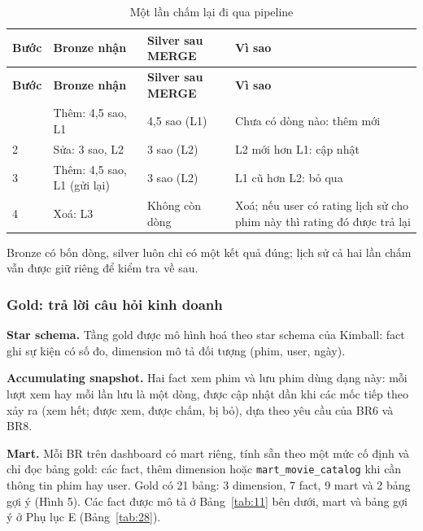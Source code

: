 \documentclass[a4paper,11pt]{article}
\newlength{\reporttablewidth}
\newcommand{\dbsep}{\_\allowbreak}
\begin{document}
\begingroup
\small
{}
\setlength{\tabcolsep}{4pt}
\renewcommand{\arraystretch}{1.18}
\setlength{\reporttablewidth}{\dimexpr\linewidth-6\tabcolsep\relax}
\begin{longtable}{@{}L{0.13\reporttablewidth} L{0.25\reporttablewidth} L{0.27\reporttablewidth} L{0.35\reporttablewidth}@{}}
\caption[Một lần chấm lại đi qua pipeline (mục 3.4)]{Một lần chấm lại đi qua pipeline}\label{tab:10} \\
\toprule
\textbf{Bước} & \textbf{Bronze nhận} & \textbf{Silver sau MERGE} & \textbf{Vì sao} \\
\midrule
\endfirsthead
\toprule
\textbf{Bước} & \textbf{Bronze nhận} & \textbf{Silver sau MERGE} & \textbf{Vì sao} \\
\midrule
\endhead
\midrule
\endfoot
\bottomrule
{} & Thêm: 4,5 sao, L1 & 4,5 sao (L1) & Chưa có dòng nào: thêm mới \\
2 & Sửa: 3 sao, L2 & 3 sao (L2) & L2 mới hơn L1: cập nhật \\
3 & Thêm: 4,5 sao, L1 (gửi lại) & 3 sao (L2) & L1 cũ hơn L2: bỏ qua \\
4 & Xoá: L3 & Không còn dòng & Xoá; nếu user có rating lịch sử cho phim này thì rating đó được trả lại \\
\end{longtable}
\endgroup

Bronze có bốn dòng, silver luôn chỉ có một kết quả đúng; lịch sử cả hai lần chấm vẫn được giữ riêng để kiểm tra về sau.

\subsubsection*{Gold: trả lời câu hỏi kinh doanh}

\textbf{Star schema.} Tầng gold được mô hình hoá theo star schema của Kimball: fact ghi sự kiện có số đo, dimension mô tả đối tượng (phim, user, ngày).

\textbf{Accumulating snapshot.} Hai fact xem phim và lưu phim dùng dạng này: mỗi lượt xem hay mỗi lần lưu là một dòng, được cập nhật dần khi các mốc tiếp theo xảy ra (xem hết; được xem, được chấm, bị bỏ), dựa theo yêu cầu của BR6 và BR8.

\textbf{Mart.} Mỗi BR trên dashboard có mart riêng, tính sẵn theo một mức cố định và chỉ đọc bảng gold: các fact, thêm dimension hoặc \texttt{mart\dbsep{}movie\dbsep{}catalog} khi cần thông tin phim hay user. Gold có 21 bảng: 3 dimension, 7 fact, 9 mart và 2 bảng gợi ý (Hình 5). Các fact được mô tả ở Bảng~\ref{tab:11} bên dưới, mart và bảng gợi ý ở Phụ lục E (Bảng~\ref{tab:28}).
\end{document}
